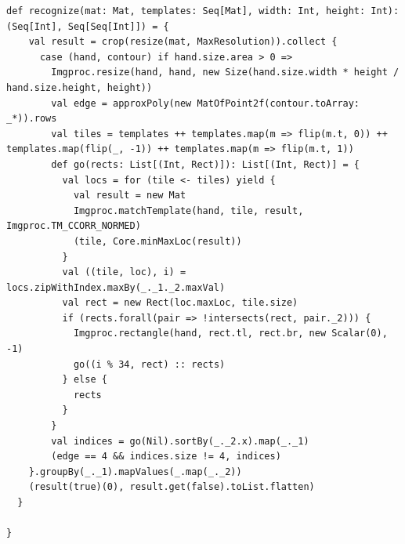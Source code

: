 \documentclass{jsarticle}
\begin{document}
\begin{lstlisting}[caption=TemplateMatching.scala,label=TemplateMatching]
  def recognize(mat: Mat, templates: Seq[Mat], width: Int, height: Int): (Seq[Int], Seq[Seq[Int]]) = {
    val result = crop(resize(mat, MaxResolution)).collect {
      case (hand, contour) if hand.size.area > 0 =>
        Imgproc.resize(hand, hand, new Size(hand.size.width * height / hand.size.height, height))
        val edge = approxPoly(new MatOfPoint2f(contour.toArray: _*)).rows
        val tiles = templates ++ templates.map(m => flip(m.t, 0)) ++ templates.map(flip(_, -1)) ++ templates.map(m => flip(m.t, 1))
        def go(rects: List[(Int, Rect)]): List[(Int, Rect)] = {
          val locs = for (tile <- tiles) yield {
            val result = new Mat
            Imgproc.matchTemplate(hand, tile, result, Imgproc.TM_CCORR_NORMED)
            (tile, Core.minMaxLoc(result))
          }
          val ((tile, loc), i) = locs.zipWithIndex.maxBy(_._1._2.maxVal)
          val rect = new Rect(loc.maxLoc, tile.size)
          if (rects.forall(pair => !intersects(rect, pair._2))) {
            Imgproc.rectangle(hand, rect.tl, rect.br, new Scalar(0), -1)
            go((i % 34, rect) :: rects)
          } else {
            rects
          }
        }
        val indices = go(Nil).sortBy(_._2.x).map(_._1)
        (edge == 4 && indices.size != 4, indices)
    }.groupBy(_._1).mapValues(_.map(_._2))
    (result(true)(0), result.get(false).toList.flatten)
  }

}
\end{lstlisting}
\end{document}
